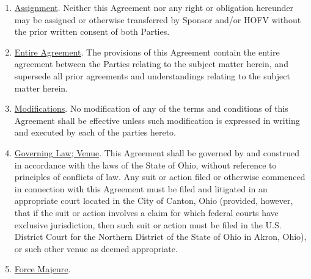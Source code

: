 \documentclass[]{article}
\begin{document}
\begin{enumerate}
  \begin{enumerate}
  \def\labelenumii{\arabic{enumii}.}
  \item
    \uline{Assignment}. Neither this Agreement nor any right or
    obligation hereunder may be assigned or otherwise transferred by
    Sponsor and/or HOFV without the prior written consent of both
    Parties.
  \item
    \uline{Entire Agreement}. The provisions of this Agreement contain
    the entire agreement between the Parties relating to the subject
    matter herein, and supersede all prior agreements and understandings
    relating to the subject matter herein.
  \item
    \uline{Modifications}. No modification of any of the terms and
    conditions of this Agreement shall be effective unless such
    modification is expressed in writing and executed by each of the
    parties hereto.
  \item
    \uline{Governing Law; Venue}. This Agreement shall be governed by
    and construed in accordance with the laws of the State of Ohio,
    without reference to principles of conflicts of law. Any suit or
    action filed or otherwise commenced in connection with this
    Agreement must be filed and litigated in an appropriate court
    located in the City of Canton, Ohio (provided, however, that if the
    suit or action involves a claim for which federal courts have
    exclusive jurisdiction, then such suit or action must be filed in
    the U.S. District Court for the Northern District of the State of
    Ohio in Akron, Ohio), or such other venue as deemed appropriate.
  \item
    \uline{Force Majeure}.


\end{enumerate}
\end{enumerate}
\end{document}
